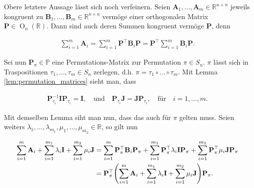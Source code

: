 \begin{remark}
    
    Obere letztere Aussage lässt sich noch verfeinern.
    Seien $\mathbf A_1, \dots, \mathbf A_m \in \mathbb R^{n \times n}$ jeweils kongruent zu $\mathbf B_1, \dots, \mathbf B_m \in \mathbb R^{n \times n}$ vermöge einer orthogonalen Matrix $\mathbf P \in \operatorname O_n(\mathbb R)$.
    Dann sind auch deren Summen kongruent vermöge $\mathbf P$, denn

    \begin{align*}
        \sum_{i=1}^m \mathbf A_i
        =
        \sum_{i=1}^m \mathbf P^\top \mathbf B_i \mathbf P
        =
        \mathbf P^\top \sum_{i=1}^m \mathbf B_i \mathbf P.
    \end{align*}

    Sei nun $\mathbf P_\pi \in \mathbb P$ eine Permutations-Matrix zur Permutation $\pi \in S_n$.
    $\pi$ lässt sich in Traspositionen $\tau_1, \dots, \tau_m \in S_n$ zerlegen, d.h. $\pi = \tau_1 \circ \dots \circ \tau_m$.
    Mit Lemma \ref{lem:permutation_matrices} sieht man, dass

    \begin{align*}
        \mathbf P_{\tau_i}^{-1} \mathbf I \mathbf P_{\tau_i} = \mathbf I,
        \quad
        \text{und}
        \quad
        \mathbf P_{\tau_i} \mathbf J = \mathbf J \mathbf P_{\tau_i},
        \quad
        \text{für}
        \quad
        i = 1, \dots, m.
    \end{align*}

    Mit demselben Lemma siht man nun, dass das auch für $\pi$ gelten muss.
    Seien weiters $\lambda_1, \dots, \lambda_{m_1}, \mu_1, \dots, \mu_{m_2} \in \mathbb R$, so gilt nun

    \begin{align*}
        \sum_{i=1}^m \mathbf A_i
        +
        \sum_{i=1}^{m_1} \lambda_i \mathbf I
        +
        \sum_{i=1}^{m_2} \mu_i \mathbf J
        & =
        \sum_{i=1}^m \mathbf P_\pi^\top \mathbf B_i \mathbf P_\pi
        +
        \sum_{i=1}^{m_1} \mathbf P_\pi^\top \lambda_i \mathbf I \mathbf P_\pi
        +
        \sum_{i=1}^{m_2} \mathbf P_\pi^\top \mu_i \mathbf J \mathbf P_\pi \\
        & =
        \mathbf P_\pi^\top
        {\left ( 
            \sum_{i=1}^m \mathbf A_i
            +
            \sum_{i=1}^{m_1} \lambda_i \mathbf I
            +
            \sum_{i=1}^{m_2} \mu_i \mathbf J
         \right )}
        \mathbf P_\pi.
    \end{align*}

\end{remark}
